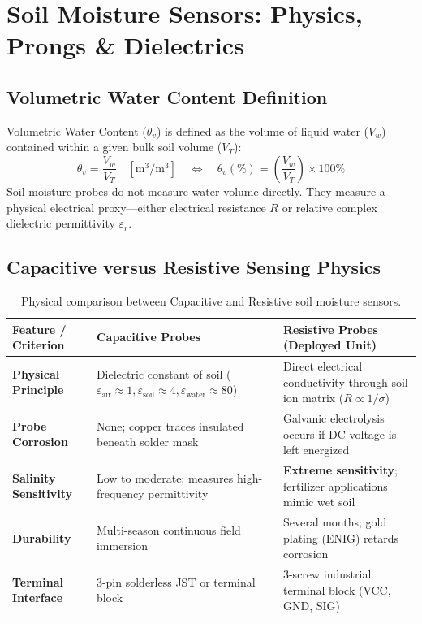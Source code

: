 \documentclass[11pt,a4paper,oneside]{report}
\begin{document}
\chapter{Soil Moisture Sensors: Physics, Prongs \& Dielectrics}

\section{Volumetric Water Content Definition}
Volumetric Water Content ($\theta_v$) is defined as the volume of liquid water ($V_w$) contained within a given bulk soil volume ($V_T$):
\begin{equation}
\theta_v = \frac{V_w}{V_T} \quad [\text{m}^3/\text{m}^3] \quad \Longleftrightarrow \quad \theta_v(\%) = \left(\frac{V_w}{V_T}\right) \times 100\%
\end{equation}
Soil moisture probes do not measure water volume directly. They measure a physical electrical proxy—either electrical resistance $R$ or relative complex dielectric permittivity $\varepsilon_r$.

\section{Capacitive versus Resistive Sensing Physics}
\begin{table}[h!]
\centering
\small
\begin{tabularx}{\linewidth}{lXX}
\toprule
\textbf{Feature / Criterion} & \textbf{Capacitive Probes} & \textbf{Resistive Probes (Deployed Unit)} \\
\midrule
\textbf{Physical Principle} & Dielectric constant of soil ($\varepsilon_{\text{air}} \approx 1, \varepsilon_{\text{soil}} \approx 4, \varepsilon_{\text{water}} \approx 80$) & Direct electrical conductivity through soil ion matrix ($R \propto 1 / \sigma$) \\
\textbf{Probe Corrosion} & None; copper traces insulated beneath solder mask & Galvanic electrolysis occurs if DC voltage is left energized \\
\textbf{Salinity Sensitivity} & Low to moderate; measures high-frequency permittivity & \textbf{Extreme sensitivity}; fertilizer applications mimic wet soil \\
\textbf{Durability} & Multi-season continuous field immersion & Several months; gold plating (ENIG) retards corrosion \\
\textbf{Terminal Interface} & 3-pin solderless JST or terminal block & 3-screw industrial terminal block (VCC, GND, SIG) \\
\bottomrule
\end{tabularx}
\caption{Physical comparison between Capacitive and Resistive soil moisture sensors.}
\end{table}
\end{document}
